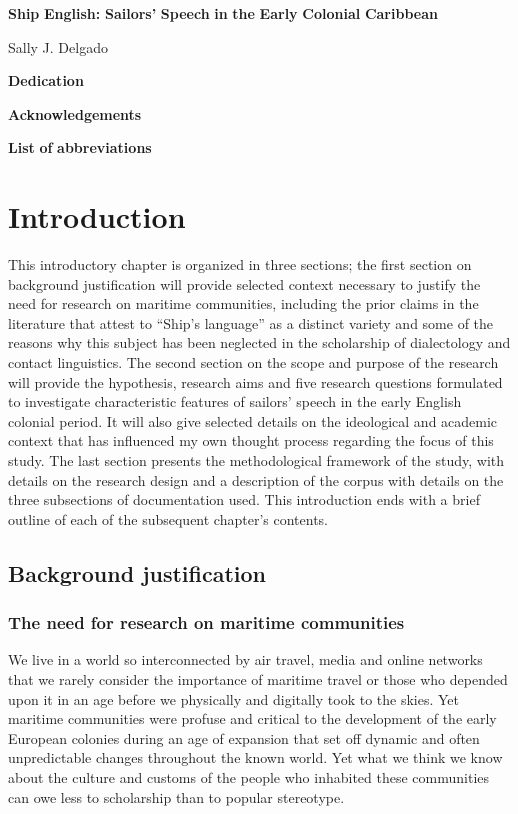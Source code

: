 

\textbf{Ship} \textbf{English:} \textbf{Sailors’} \textbf{Speech} \textbf{in} \textbf{the} \textbf{Early} \textbf{Colonial} \textbf{Caribbean}

Sally J. Delgado

\textbf{Dedication}




\textbf{Acknowledgements}


\textbf{List} \textbf{of} \textbf{abbreviations}


\chapter{Introduction}

This introductory chapter is organized in three sections; the first section on background justification will provide selected context necessary to justify the need for research on maritime communities, including the prior claims in the literature that attest to “Ship’s language” as a distinct variety and some of the reasons why this subject has been neglected in the scholarship of dialectology and contact linguistics. The second section on the scope and purpose of the research will provide the hypothesis, research aims and five research questions formulated to investigate characteristic features of sailors’ speech in the early English colonial period. It will also give selected details on the ideological and academic context that has influenced my own thought process regarding the focus of this study. The last section presents the methodological framework of the study, with details on the research design and a description of the corpus with details on the three subsections of documentation used. This introduction ends with a brief outline of each of the subsequent chapter’s contents.



\section{{Background} {justification} }%



\subsection{{The} {need} {for} {research} {on} {maritime} {communities}}%



We live in a world so interconnected by air travel, media and online networks that we rarely consider the importance of maritime travel or those who depended upon it in an age before we physically and digitally took to the skies. Yet maritime communities were profuse and critical to the development of the early European colonies during an age of expansion that set off dynamic and often unpredictable changes throughout the known world. Yet what we think we know about the culture and customs of the people who inhabited these communities can owe less to scholarship than to popular stereotype. 



